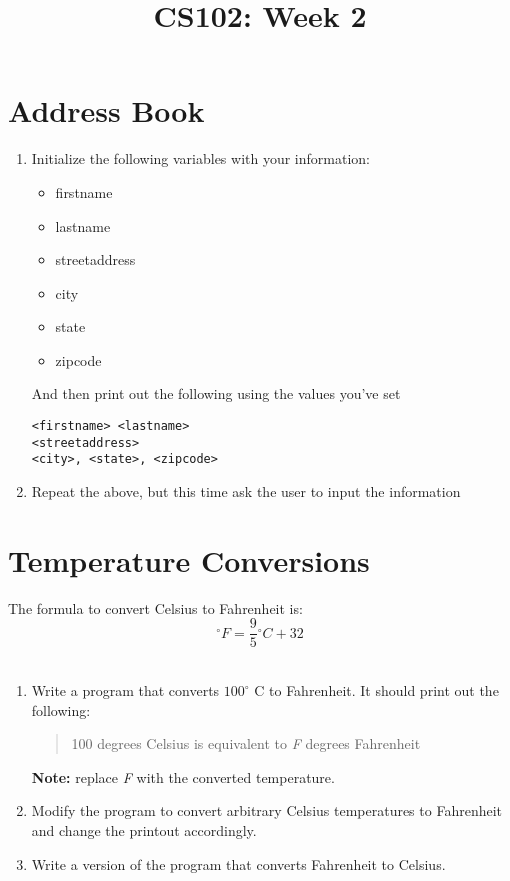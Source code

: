 \documentclass{article}
\begin{document}
\title{CS102: Week 2}

\maketitle
\section*{Address Book}
\begin{enumerate}
\item Initialize the following variables with your information:
	\begin{itemize}	
 		\item firstname
		\item lastname
		\item streetaddress
		\item city
		\item state
		\item zipcode
	\end{itemize}
And then print out the following using the values you've set
\begin{verbatim}
<firstname> <lastname>
<streetaddress> 
<city>, <state>, <zipcode>
\end{verbatim}
 \item Repeat the above, but this time ask the user to input the information
\end{enumerate}

\section*{Temperature Conversions}
The formula to convert Celsius to Fahrenheit is:
\begin{equation}	
^{\circ} F =  \frac{9}{5} {^{\circ}C} + 32
\end{equation}
\\
\begin{enumerate}
\item Write a program that converts $100^{\circ}$ C to Fahrenheit. It should print out the following:
	\begin{quote}
	100 degrees Celsius is equivalent to \textit{F} degrees Fahrenheit
	\end{quote}
\textbf{Note:} replace \textit{F} with the converted temperature. 
\item Modify the program to convert arbitrary Celsius temperatures to Fahrenheit and change the printout accordingly.
\item Write a version of the program that converts Fahrenheit to Celsius. 
\end{enumerate}
\end{document}

